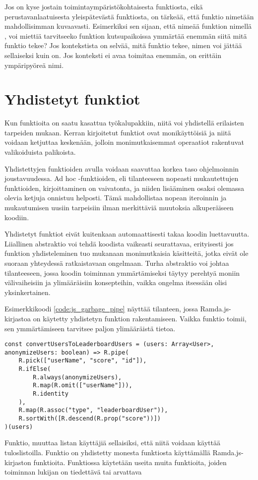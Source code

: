 Jos on kyse jostain toimintaympäristökohtaisesta funktiosta, eikä perustavanlaatuisesta yleispätevästä funktiosta, on tärkeää, että funktio nimetään mahdollisimman kuvaavasti. Esimerkiksi sen sijaan, että nimeää funktion nimellä , voi miettiä tarvitseeko funktion kutsupaikoissa ymmärtää enemmän siitä mitä funktio tekee? Jos kontekstista on selvää, mitä funktio tekee, nimen voi jättää sellaiseksi kuin on. Jos konteksti ei avaa toimitaa enemmän,  on erittäin ympäripyöreä nimi.

\section{Yhdistetyt funktiot}

Kun funktioita on saatu kasattua työkalupakkiin, niitä voi yhdistellä erilaisten tarpeiden mukaan. Kerran kirjoitetut funktiot ovat monikäyttöisiä ja niitä voidaan ketjuttaa keskenään, jolloin monimutkaisemmat operaatiot rakentuvat valikoiduista palikoista.

Yhdistettyjen funktioiden avulla voidaan saavuttaa korkea taso ohjelmoinnin joustavuudessa. Ad hoc -funktioiden, eli tilanteeseen nopeasti mukautettujen funktioiden, kirjoittaminen on vaivatonta, ja niiden lisääminen osaksi olemassa olevia ketjuja onnistuu helposti. Tämä mahdollistaa nopean iteroinnin ja mukautumisen uusiin tarpeisiin ilman merkittäviä muutoksia alkuperäiseen koodiin.

Yhdistetyt funktiot eivät kuitenkaan automaattisesti takaa koodin luettavuutta. Liiallinen abstraktio voi tehdä koodista vaikeasti seurattavaa, erityisesti jos funktion yhdisteleminen tuo mukanaan monimutkaisia käsitteitä, jotka eivät ole suoraan yhteydessä ratkaistavaan ongelmaan. Turha abstraktio voi johtaa tilanteeseen, jossa koodin toiminnan ymmärtämiseksi täytyy perehtyä moniin välivaiheisiin ja ylimääräisiin konsepteihin, vaikka ongelma itsessään olisi yksinkertainen.

Esimerkkikoodi \ref{code:js_garbage_pipe} näyttää tilanteen, jossa Ramda.js-kirjastoa on käytetty yhdistetyn funktion rakentamiseen. Vaikka funktio toimii, sen ymmärtämiseen tarvitsee paljon ylimääräistä tietoa.

\begin{code}
    \begin{verbatim}
const convertUsersToLeaderboardUsers = (users: Array<User>, anonymizeUsers: boolean) => R.pipe(
    R.pick(["userName", "score", "id"]),
    R.ifElse(
        R.always(anonymizeUsers), 
        R.map(R.omit(["userName"])), 
        R.identity
    ),
    R.map(R.assoc("type", "leaderboardUser")),
    R.sortWith([R.descend(R.prop("score"))])
)(users)
\end{verbatim}
    \caption{Funktio, muuttaa listan käyttäjiä sellaisiksi, että niitä voidaan käyttää tuloslistoilla. Funktio on yhdistetty monesta funktiosta käyttämällä Ramda.js-kirjaston funktioita. Funktiossa käytetään useita muita funktioita, joiden toiminnan lukijan on tiedettävä tai arvattava}
    \label{code:js_garbage_pipe}
\end{code}

